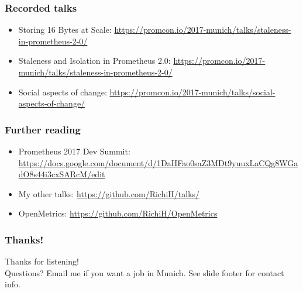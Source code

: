 \documentclass[t]{beamer}
\begin{document}
\begin{frame}
	\frametitle{Recorded talks}
	\begin{itemize}
		\item Storing 16 Bytes at Scale: \url{https://promcon.io/2017-munich/talks/staleness-in-prometheus-2-0/}
		\item Staleness and Isolation in Prometheus 2.0: \url{https://promcon.io/2017-munich/talks/staleness-in-prometheus-2-0/}
		\item Social aspects of change: \url{https://promcon.io/2017-munich/talks/social-aspects-of-change/}
	\end{itemize}
\end{frame}


\begin{frame}
	\frametitle{Further reading}
	\begin{itemize}
		\item Prometheus 2017 Dev Summit: \url{https://docs.google.com/document/d/1DaHFao0saZ3MDt9yuuxLaCQg8WGadO8s44i3cxSARcM/edit}
		\item My other talks: \url{https://github.com/RichiH/talks/}
		\item OpenMetrics: \url{https://github.com/RichiH/OpenMetrics}
	\end{itemize}
\end{frame}

\begin{frame}
	\frametitle{Thanks!}
		\begin{center}
			\vfill
			Thanks for listening!\\
			\vfill
			Questions?
			\vfill
			Email me if you want a job in Munich.
			\vfill
			See slide footer for contact info.
			\vfill
		\end{center}
\end{frame}
\end{document}
